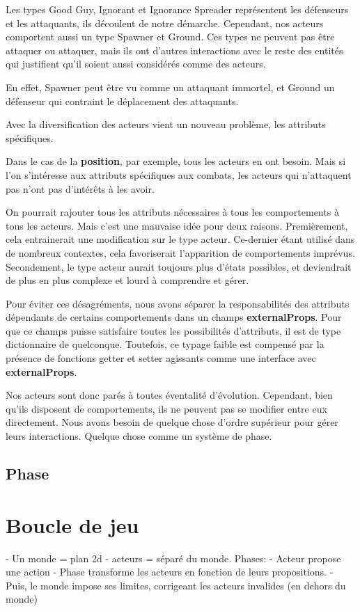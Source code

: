 \documentclass{article}
\begin{document}
Les types Good Guy, Ignorant et Ignorance Spreader représentent 
les défenseurs et les attaquants, ils découlent de notre démarche.
Cependant, nos acteurs comportent aussi un type Spawner et Ground.
Ces types ne peuvent pas être attaquer ou attaquer, mais ils ont 
d'autres interactions avec le reste des entités qui justifient qu'il 
soient aussi considérés comme des acteurs.

En effet, Spawner peut être vu comme un attaquant immortel, et Ground 
un défenseur qui contraint le déplacement des attaquants.

Avec la diversification des acteurs vient un nouveau problème,
les attributs spécifiques.

Dans le cas de la \textbf{position}, par exemple, tous les acteurs en ont besoin.
Mais si l'on s'intéresse aux attributs spécifiques aux combats, les acteurs 
qui n'attaquent pas n'ont pas d'intérêts à les avoir.

On pourrait rajouter tous les attributs nécessaires à tous les comportements 
à tous les acteurs. Mais c'est une mauvaise idée pour deux raisons.
Premièrement, cela entrainerait une modification sur le type acteur.
Ce-dernier étant utilisé dans de nombreux contextes, cela favoriserait 
l'apparition de comportements imprévus.
Secondement, le type acteur aurait toujours plus d'états possibles, 
et deviendrait de plus en plus complexe et lourd à comprendre et gérer.

Pour éviter ces désagréments, nous avons séparer la responsabilités des attributs 
dépendants de certains comportements dans un champs \textbf{externalProps}.
Pour que ce champs puisse satisfaire toutes les possibilités d'attributs, il
est de type dictionnaire de quelconque. Toutefois, ce typage faible est compensé 
par la présence de fonctions getter et setter agissants comme une interface 
avec \textbf{externalProps}.

Nos acteurs sont donc parés à toutes éventalité d'évolution.
Cependant, bien qu'ils disposent de comportements, ils ne peuvent pas se modifier 
entre eux directement.
Nous avons besoin de quelque chose d'ordre supérieur pour gérer leurs interactions.
Quelque chose comme un système de phase.

\subsection{Phase}




\section{Boucle de jeu}
- Un monde = plan 2d
- acteurs = séparé du monde.
Phases:
 - Acteur propose une action
 - Phase transforme les acteurs en fonction de leurs propositions.
 - Puis, le monde impose ses limites, corrigeant les acteurs invalides (en dehors du monde)
\end{document}
